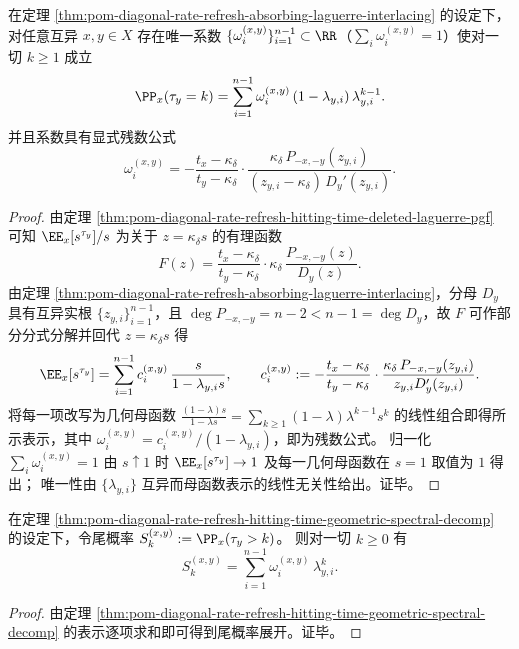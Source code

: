 \begin{theorem}[几何谱分解表示]\label{thm:pom-diagonal-rate-refresh-hitting-time-geometric-spectral-decomp}
在定理 \ref{thm:pom-diagonal-rate-refresh-absorbing-laguerre-interlacing} 的设定下，
对任意互异 \(x,y\in X\) 存在唯一系数 \(\{\omega_i^{(x,y)}\}_{i=1}^{n-1}\subset\RR\)（\(\sum_i\omega_i^{(x,y)}=1\)）使对一切 \(k\ge 1\) 成立
\[
\PP_x(\tau_y=k)=\sum_{i=1}^{n-1}\omega_i^{(x,y)}\,(1-\lambda_{y,i})\,\lambda_{y,i}^{k-1}.
\]
并且系数具有显式残数公式
\[
\omega_i^{(x,y)}
=
-\frac{t_x-\kappa_\delta}{t_y-\kappa_\delta}\cdot
\frac{\kappa_\delta\,P_{-x,-y}(z_{y,i})}{(z_{y,i}-\kappa_\delta)\,D_y'(z_{y,i})}.
\]
\end{theorem}
\begin{proof}
由定理 \ref{thm:pom-diagonal-rate-refresh-hitting-time-deleted-laguerre-pgf} 可知 \(\EE_x[s^{\tau_y}]/s\) 为关于 \(z=\kappa_\delta s\) 的有理函数
\[
F(z)=\frac{t_x-\kappa_\delta}{t_y-\kappa_\delta}\cdot \kappa_\delta\,\frac{P_{-x,-y}(z)}{D_y(z)}.
\]
由定理 \ref{thm:pom-diagonal-rate-refresh-absorbing-laguerre-interlacing}，分母 \(D_y\) 具有互异实根 \(\{z_{y,i}\}_{i=1}^{n-1}\)，且 \(\deg P_{-x,-y}=n-2< n-1=\deg D_y\)，故 \(F\) 可作部分分式分解并回代 \(z=\kappa_\delta s\) 得
\[
\EE_x[s^{\tau_y}]
=\sum_{i=1}^{n-1}c_i^{(x,y)}\,\frac{s}{1-\lambda_{y,i}s},
\qquad
c_i^{(x,y)}:=-\frac{t_x-\kappa_\delta}{t_y-\kappa_\delta}\cdot
\frac{\kappa_\delta\,P_{-x,-y}(z_{y,i})}{z_{y,i}D_y'(z_{y,i})}.
\]
将每一项改写为几何母函数 \(\frac{(1-\lambda)s}{1-\lambda s}=\sum_{k\ge 1}(1-\lambda)\lambda^{k-1}s^k\) 的线性组合即得所示表示，其中 \(\omega_i^{(x,y)}=c_i^{(x,y)}/(1-\lambda_{y,i})\)，即为残数公式。
归一化 \(\sum_i\omega_i^{(x,y)}=1\) 由 \(s\uparrow 1\) 时 \(\EE_x[s^{\tau_y}]\to 1\) 及每一几何母函数在 \(s=1\) 取值为 \(1\) 得出；
唯一性由 \(\{\lambda_{y,i}\}\) 互异而母函数表示的线性无关性给出。证毕。
\end{proof}

\begin{corollary}[尾概率的几何谱展开]\label{cor:pom-diagonal-rate-refresh-hitting-time-tail-spectral}
在定理 \ref{thm:pom-diagonal-rate-refresh-hitting-time-geometric-spectral-decomp} 的设定下，令尾概率 \(S_k^{(x,y)}:=\PP_x(\tau_y>k)\)。
则对一切 \(k\ge 0\) 有
\[
S_k^{(x,y)}=\sum_{i=1}^{n-1}\omega_i^{(x,y)}\,\lambda_{y,i}^{k}.
\]
\end{corollary}
\begin{proof}
由定理 \ref{thm:pom-diagonal-rate-refresh-hitting-time-geometric-spectral-decomp} 的表示逐项求和即可得到尾概率展开。证毕。
\end{proof}

